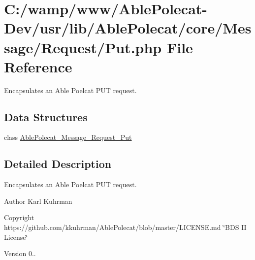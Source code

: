 \hypertarget{_put_8php}{}\section{C\+:/wamp/www/\+Able\+Polecat-\/\+Dev/usr/lib/\+Able\+Polecat/core/\+Message/\+Request/\+Put.php File Reference}
\label{_put_8php}


Encapsulates an Able Poelcat P\+U\+T request.  


\subsection*{Data Structures}
\begin{DoxyCompactItemize}
\item 
class \hyperlink{class_able_polecat___message___request___put}{Able\+Polecat\+\_\+\+Message\+\_\+\+Request\+\_\+\+Put}
\end{DoxyCompactItemize}


\subsection{Detailed Description}
Encapsulates an Able Poelcat P\+U\+T request. 

\begin{DoxyAuthor}{Author}
Karl Kuhrman 
\end{DoxyAuthor}
\begin{DoxyCopyright}{Copyright}
https\+://github.com/kkuhrman/\+Able\+Polecat/blob/master/\+L\+I\+C\+E\+N\+S\+E.\+md \char`\"{}\+B\+D\+S I\+I License\char`\"{} 
\end{DoxyCopyright}
\begin{DoxyVersion}{Version}
0.. 
\end{DoxyVersion}

